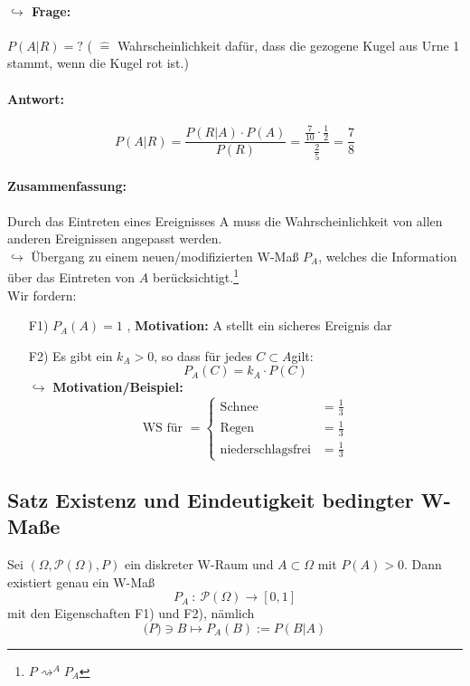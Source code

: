 \documentclass[12pt,a4paper]{article}
\begin{document}
 	\paragraph{$\hookrightarrow$ Frage:}
	$P(A|R)= ?$ ( $\widehat{=}$ Wahrscheinlichkeit dafür, dass die gezogene Kugel aus Urne 1 stammt, wenn die Kugel rot ist.) 
	\paragraph{Antwort:}
	$$P(A|R)=\frac{P(R|A)\cdot P(A)}{P(R)}=\frac{\frac{7}{10}\cdot 
\frac{1}{2}}{\frac{2}{5}}=\frac{7}{8}$$	
 	\paragraph{Zusammenfassung:}
 	Durch das Eintreten eines Ereignisses A muss die Wahrscheinlichkeit von allen anderen Ereignissen angepasst werden.\\
 	$\hookrightarrow$ Übergang zu einem neuen/modifizierten W-Maß $P_A$, welches die Information über das Eintreten von $A$ berücksichtigt.\footnote{$P\rightsquigarrow^A P_A$}\\
 	Wir fordern:
 	\begin{itemize}
 		\item[F1)] $P_A(A)=1$ , \textbf{Motivation:} A stellt ein sicheres Ereignis dar
 		\item[F2)] Es gibt ein $k_A >0$, so dass für jedes $C\subset A$gilt:
 		$$P_A (C)=k_A \cdot P(C)$$
 		$\hookrightarrow$ \textbf{Motivation/Beispiel:}
 		\[
 		\text{WS für }=\left\{\begin{array}{lr}
 		\text{Schnee} & = \frac{1}{3}\\
 		\text{Regen} & = \frac{1}{3}\\
 		\text{niederschlagsfrei} & = \frac{1}{3}
 	\end{array}\right.
 	\] 
 	\end{itemize}
 	
 	\subsection{Satz Existenz und Eindeutigkeit bedingter W-Maße}
 	Sei $(\Omega,\mathcal{P}(\Omega),P)$ ein diskreter W-Raum und $A\subset\Omega$ mit $P(A)>0$. Dann existiert genau ein W-Maß
 	$$P_A\: : \: \mathcal{P}(\Omega)\rightarrow [0,1]$$
 	mit den Eigenschaften F1) und F2), nämlich 
 	\begin{equation}
 	\label{eq01}
 	\mathcal(P)\ni B\mapsto P_A(B):=P(B|A)
 	\end{equation}
 	
\end{document}
